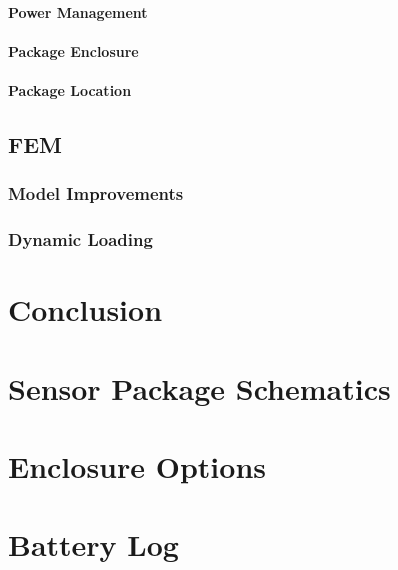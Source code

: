 \documentclass[12pt]{report}
\begin{document}
			\subsubsection{Power Management}
			\subsubsection{Package Enclosure}
				
			\subsubsection{Package Location}
				
	\section{FEM}
		\subsection{Model Improvements}
		\subsection{Dynamic Loading}
\chapter{Conclusion}




\appendix

\chapter{Sensor Package Schematics}
\label{app:Schematic}


\chapter{Enclosure Options}
\label{app:CaseOptions}


\chapter{Battery Log}
\label{app:batterylog}

 
\end{document}
